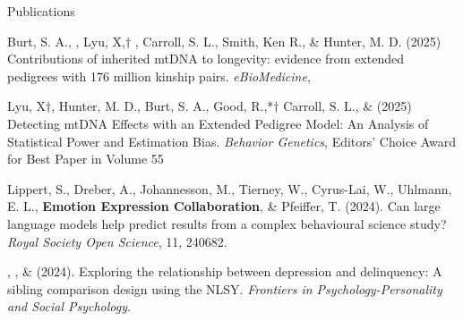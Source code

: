\begin{rSection}{\textrm{Publications}}
\begin{etaremune}
\item Burt, S. A., \meb, Lyu, X,$\dagger$ \joe, Carroll, S. L., Smith, Ken R., \& Hunter, M. D. (2025) Contributions of inherited mtDNA to longevity: evidence from extended pedigrees with 176 million kinship pairs. \textit{eBioMedicine},  %

\item Lyu, X$\dagger$, Hunter, M. D., Burt, S. A., Good, R.,*$\dagger$ Carroll, S. L., \& \meb (2025) Detecting mtDNA Effects with an Extended Pedigree Model: An Analysis of Statistical Power and Estimation Bias. \textit{Behavior Genetics}, \newline
\hspace*{6pt}Editors' Choice Award for Best Paper in Volume 55

\item Lippert, S., Dreber, A., Johannesson, M., Tierney, W., Cyrus-Lai, W., Uhlmann, E. L., \textbf{Emotion Expression Collaboration}, \& Pfeiffer, T. (2024). Can large language models help predict results from a complex behavioural science study? \textit{Royal Society Open Science}, 11, 240682. 

\item \emsims, \jt, \& \meb (2024). Exploring the relationship between depression and delinquency: A sibling comparison design using the NLSY.  \textit{Frontiers in Psychology-Personality and Social Psychology}. 


\end{etaremune}
\end{rSection}
